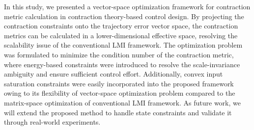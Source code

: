 \documentclass{ifacconf}
\begin{document}
In this study, we presented a vector-space optimization framework for contraction metric calculation in contraction theory-based control design.
By projecting the contraction constraints onto the trajectory error vector space, the contraction metrics can be calculated in a lower-dimensional effective space, resolving the scalability issue of the conventional LMI framework.
The optimization problem was formulated to minimize the condition number of the contraction metric, where energy-based constraints were introduced to resolve the scale-invariance ambiguity and ensure sufficient control effort. 
Additionally, convex input saturation constraints were easily incorporated into the proposed framework owing to its flexibility of vector-space optimization problem compared to the matrix-space optimization of conventional LMI framework.
As future work, we will extend the proposed method to handle state constraints and validate it through real-world experiments.


\end{document}

